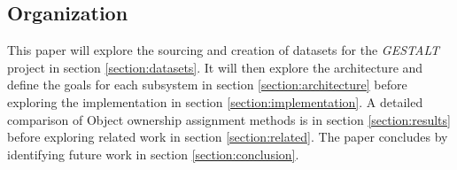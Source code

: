 \subsection{Organization}
This paper will explore the sourcing and creation of datasets for the \textit{GESTALT} project in section \ref{section:datasets}. It will then explore the architecture and define the goals for each subsystem in section \ref{section:architecture} before exploring the implementation in section \ref{section:implementation}. A detailed comparison of Object ownership assignment methods is in section \ref{section:results} before exploring related work in section \ref{section:related}. The paper concludes by identifying future work in section \ref{section:conclusion}.  
